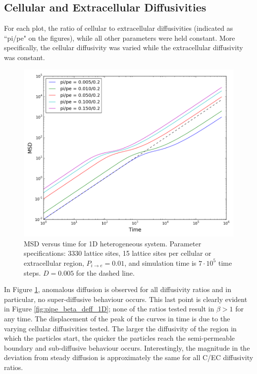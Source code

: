 \clearpage
\subsection{Cellular and Extracellular Diffusivities}
\label{sec:1D-cellular-extracellular-diffusivities}
	For each plot, the ratio of cellular to extracellular diffusivities (indicated as ``pi/pe" on the figures), while all other parameters were held constant. More specifically, the cellular diffusivity was varied while the extracellular diffusivity was constant.
	
	\begin{figure}[h!]
		\centering
		\includegraphics[width=1.0\linewidth]{../images/1D/pipe_msd_1D}
		\caption{MSD versus time for 1D heterogeneous system. Parameter specifications: 3330 lattice sites, 15 lattice sites per cellular or extracellular region, $ P_{i \rightarrow e} = 0.01 $, and simulation time is $ 7\cdot 10^5 $ time steps. $ D = 0.005 $ for the dashed line.}
		\label{fig:pipe_msd_1D}
	\end{figure}
	
	In Figure \ref{fig:pipe_msd_1D}, anomalous diffusion is observed for all diffusivity ratios and in particular, no super-diffusive behaviour occurs. This last point is clearly evident in Figure \ref{fig:pipe_beta_deff_1D}; none of the ratios tested result in $ \beta > 1 $ for any time. The displacement of the peak of the curves in time is due to the varying cellular diffusivities tested. The larger the diffusivity of the region in which the particles start, the quicker the particles reach the semi-permeable boundary and sub-diffusive behaviour occurs. Interestingly, the magnitude in the deviation from steady diffusion is approximately the same for all C/EC diffusivity ratios. 
	
